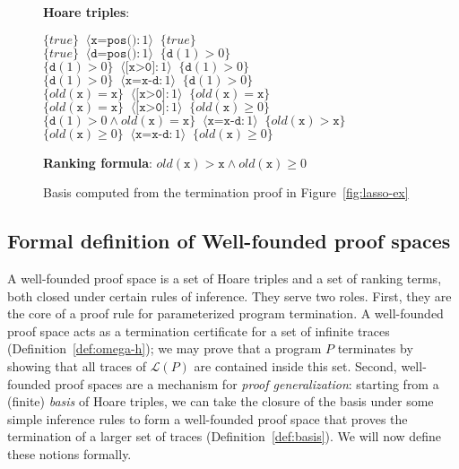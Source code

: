 \documentclass[9pt,nocopyrightspace]{sigplanconf}
\theoremstyle{definition}
\newcommand{\tuple}[1]{\langle #1 \rangle}
\newcommand{\true}{\textit{true}}
\newcommand{\hoare}[3]{\{{#1}\}\;\;#2\;\;\{{#3}\}}
\newcommand{\ic}[2]{{\tuple{#1 : #2}}}
\newcommand{\lang}{\mathcal{L}}
\newcommand{\old}[1]{\textit{old}(#1)}
\newcommand{\itrace}{infinite trace}
\begin{document}
\begin{figure}
  \textbf{Hoare triples}:
  \begin{center}
      $\hoare{\true}{\ic{\texttt{x=pos()}}{1}}{\true}$\\
      $\hoare{\true}{\ic{\texttt{d=pos()}}{1}}{\texttt{d}(1) > 0}$\\
      $\hoare{\texttt{d}(1) > 0}{\ic{\texttt{[x>0]}}{1}}{\texttt{d}(1) > 0}$\\
      $\hoare{\texttt{d}(1) > 0}{\ic{\texttt{x=x-d}}{1}}{\texttt{d}(1) > 0}$\\
      $\hoare{\old{\texttt{x}} = \texttt{x}}{\ic{\texttt{[x>0]}}{1}}{\old{\texttt{x}} = \texttt{x}}$\\
      $\hoare{\old{\texttt{x}} = \texttt{x}}{\ic{\texttt{[x>0]}}{1}}{\old{\texttt{x}} \geq 0}$\\      
      $\hoare{\texttt{d}(1) > 0 \land \old{\texttt{x}} = \texttt{x}}{\ic{\texttt{x=x-d}}{1}}{\old{\texttt{x}} > \texttt{x}}$\\
      $\hoare{\old{\texttt{x}} \geq 0}{\ic{\texttt{x=x-d}}{1}}{\old{\texttt{x}} \geq 0}$
  \end{center}
  \textbf{Ranking formula}: $\old{\texttt{x}} > \texttt{x} \land \old{\texttt{x}} \geq 0$
    \caption{Basis computed from the termination proof in Figure~\ref{fig:lasso-ex} \label{fig:basis}}
\end{figure}

\subsection{Formal definition of Well-founded proof spaces} \label{sec:formalization}

A well-founded proof space is a set of Hoare triples and a set of ranking
terms, both closed under certain rules of inference.  They serve two roles.
First, they are the core of a proof rule for parameterized program
termination.  A well-founded proof space acts as a termination certificate for
a set of \itrace{}s (Definition~\ref{def:omega-h}); we may prove that a
program $P$ terminates by showing that all traces of $\lang(P)$ are contained
inside this set.  Second, well-founded proof spaces are a mechanism for
\emph{proof generalization}: starting from a (finite) \emph{basis} of Hoare
triples, we can take the closure of the basis under some simple inference
rules to form a well-founded proof space that proves the termination of a
larger set of traces (Definition~\ref{def:basis}).  We will now define these
notions formally.
\end{document}
